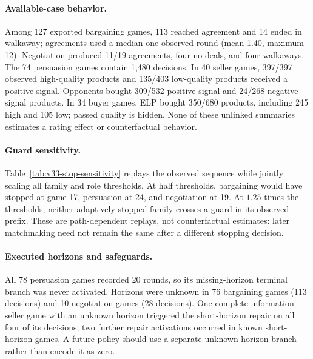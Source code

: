 \paragraph{Available-case behavior.}
Among 127 exported bargaining games, 113 reached agreement and 14 ended in
walkaway; agreements used a median one observed round (mean 1.40, maximum 12).
Negotiation produced 11/19 agreements, four no-deals, and four walkaways. The 74
persuasion games contain 1,480 decisions. In 40 seller games, 397/397 observed
high-quality products and 135/403 low-quality products received a positive
signal. Opponents bought 309/532 positive-signal and 24/268 negative-signal
products. In 34 buyer games, ELP bought 350/680 products, including 245 high and
105 low; passed quality is hidden. None of these unlinked summaries estimates a
rating effect or counterfactual behavior.

\paragraph{Guard sensitivity.}
Table~\ref{tab:v33-stop-sensitivity} replays the observed sequence while jointly
scaling all family and role thresholds. At half thresholds, bargaining would
have stopped at game 17, persuasion at 24, and negotiation at 19. At $1.25$
times the thresholds, neither adaptively stopped family crosses a guard in its
observed prefix. These are path-dependent replays, not counterfactual estimates:
later matchmaking need not remain the same after a different stopping decision.

\paragraph{Executed horizons and safeguards.}
All 78 persuasion games recorded 20 rounds, so its missing-horizon terminal
branch was never activated. Horizons were unknown in 76 bargaining games (113
decisions) and 10 negotiation games (28 decisions). One complete-information
seller game with an unknown horizon triggered the short-horizon repair on all
four of its decisions; two further repair activations occurred in known
short-horizon games. A future policy should use a separate unknown-horizon
branch rather than encode it as zero.

